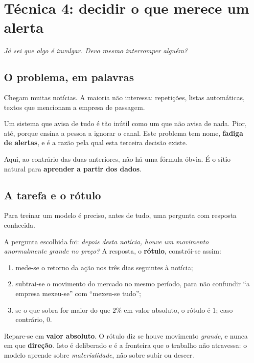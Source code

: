 \section{Técnica 4: decidir o que merece um alerta}
\label{sec:met_triagem}

\emph{Já sei que algo é invulgar. Devo mesmo interromper alguém?}

\subsection{O problema, em palavras}

Chegam muitas notícias. A maioria não interessa: repetições, listas automáticas, textos que
mencionam a empresa de passagem.

Um sistema que avisa de tudo é tão inútil como um que não avisa de nada. Pior, até, porque ensina
a pessoa a ignorar o canal. Este problema tem nome, \textbf{fadiga de alertas}, e é a razão pela
qual esta terceira decisão existe.

Aqui, ao contrário das duas anteriores, não há uma fórmula óbvia. É o sítio natural para
\textbf{aprender a partir dos dados}.

\subsection{A tarefa e o rótulo}

Para treinar um modelo é preciso, antes de tudo, uma pergunta com resposta conhecida.

A pergunta escolhida foi: \emph{depois desta notícia, houve um movimento anormalmente grande no
preço?} A resposta, o \textbf{rótulo}, constrói-se assim:

\begin{enumerate}
  \item mede-se o retorno da ação nos três dias seguintes à notícia;
  \item subtrai-se o movimento do mercado no mesmo período, para não confundir ``a empresa mexeu-se''
        com ``mexeu-se tudo'';
  \item se o que sobra for maior do que $2\%$ em valor absoluto, o rótulo é $1$; caso contrário, $0$.
\end{enumerate}

Repare-se em \textbf{valor absoluto}. O rótulo diz se houve movimento \emph{grande}, e nunca em que
\textbf{direção}. Isto é deliberado e é a fronteira que o trabalho não atravessa: o modelo aprende
sobre \emph{materialidade}, não sobre subir ou descer.

